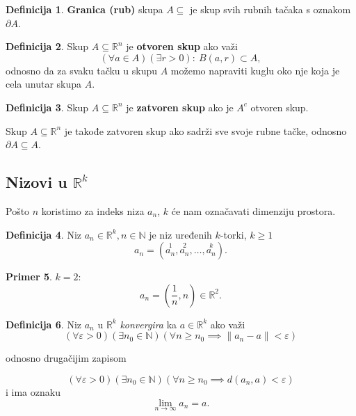 \documentclass[11pt]{article}
\theoremstyle{definition}
\newtheorem{definicija}{Definicija}[section]
\newtheorem{primer}[definicija]{Primer}
\theoremstyle{serbnodot}
\begin{document}
\begin{definicija}
    \textbf{Granica (rub)} skupa \(A \subseteq\) je skup svih rubnih tačaka s oznakom
    \(\partial A\).
\end{definicija}

\begin{definicija}
    Skup \(A \subseteq \mathbb{R}^n \) je \textbf{otvoren skup} ako važi
    \[
        (\forall a \in A) (\exists r > 0) : \ B(a,r) \subset A,
    \]
    odnosno da za svaku tačku u skupu \(A\) možemo napraviti kuglu oko nje koja je cela unutar
    skupa \(A\).
\end{definicija}

\begin{definicija}
    Skup \(A \subseteq \mathbb{R}^n \) je \textbf{zatvoren skup} ako je \(A^c\) otvoren skup.

    Skup \(A \subseteq \mathbb{R}^n \) je takođe zatvoren skup ako sadrži sve svoje 
    rubne tačke, odnosno \( \partial A \subseteq A \).
\end{definicija}

\subsection{Nizovi u \(\mathbb{R}^k\)}

Pošto \(n\) koristimo za indeks niza \(a_n\), \(k\) će nam označavati dimenziju prostora.

\begin{definicija}
    Niz \(a_n \in \mathbb{R}^k, n \in \mathbb{N} \) je niz uređenih \(k\)-torki, \(k \geq 1\)
    \[
        a_n = (\overset{1}{a_n}, \overset{2}{a_n}, \dots, \overset{k}{a_n}).
    \]
\end{definicija}

\begin{primer}
    \(k = 2\):
    \[
        a_n = (\frac{1}{n}, n) \in \mathbb{R}^2.
    \]
\end{primer}

\begin{definicija}
    Niz \(a_n\) u \(\mathbb{R}^k\) \textit{konvergira} ka \(a \in \mathbb{R}^k \) ako važi
    \[
        (\forall \varepsilon > 0) (\exists n_0 \in \mathbb{N}) 
        (\forall n \geq n_0 \implies \lVert a_n - a \rVert < \varepsilon) 
    \]
    \begin{center}
        odnosno drugačijim zapisom 
    \end{center}
    \[
        (\forall \varepsilon > 0) (\exists n_0 \in \mathbb{N}) 
        (\forall n \geq n_0 \implies d(a_n, a) < \varepsilon) 
    \]
    i ima oznaku
    \[
        \lim_{n \to \infty} {a_n} = a.
    \]
\end{definicija}
    
\end{document}

